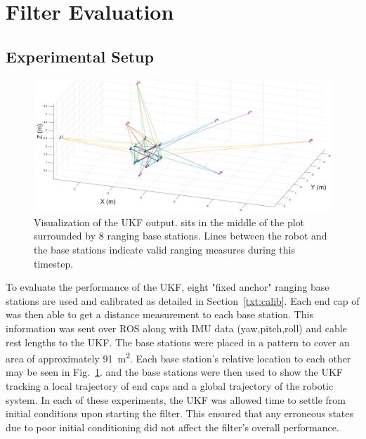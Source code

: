 {\section{Filter Evaluation}
\subsection{Experimental Setup}
\begin{figure}[tpbh]
 \centering
  \includegraphics[width=\linewidth]{tex/img/matlab_figure_ranging_b45.pdf}
 \caption{Visualization of the UKF output. \SB{} sits in the middle of the plot surrounded by 8 ranging base stations. Lines between the robot and the base stations indicate valid ranging measures during this timestep.}
\label{fig:SUPERballMATLAB}
 \end{figure}
 
To evaluate the performance of the UKF, eight "fixed anchor" ranging base stations are used and calibrated as detailed in Section~\ref{txt:calib}.
Each end cap of \SB{} was then able to get a distance measurement to each base station.
This information was sent over ROS along with IMU data (yaw,pitch,roll) and cable rest lengths to the UKF.
The base stations were placed in a pattern to cover an area of approximately \SI{91}{\meter^2}. 
Each base station's relative location to each other may be seen in Fig.~\ref{fig:SUPERballMATLAB}.
\SB{} and the base stations were then used to show the UKF tracking a local trajectory of end caps and a global trajectory of the robotic system.
In each of these experiments, the UKF was allowed time to settle from initial conditions upon starting the filter.
This ensured that any erroneous states due to poor initial conditioning did not affect the filter's overall performance. 

}
